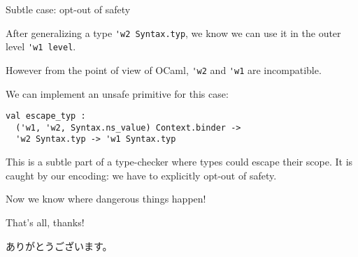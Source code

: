 \documentclass{beamer}          %
\begin{document}
\begin{frame}[fragile]{Subtle case: opt-out of safety}

  After generalizing a type \lstinline{'w2 Syntax.typ}, we know we can use it in the outer level \lstinline{'w1 level}.

  However from the point of view of OCaml, \lstinline{'w2} and \lstinline{'w1} are incompatible.

  \pause

We can implement an unsafe primitive for this case:
\begin{lstlisting}
val escape_typ :
  ('w1, 'w2, Syntax.ns_value) Context.binder ->
  'w2 Syntax.typ -> 'w1 Syntax.typ
\end{lstlisting}

This is a subtle part of a type-checker where types could escape their scope. It is caught by our encoding: we have to explicitly opt-out of safety.

Now we know where dangerous things happen!

\end{frame}

\begin{frame}{That's all, thanks!}

  ありがとうございます。

\end{frame}
\end{document}
